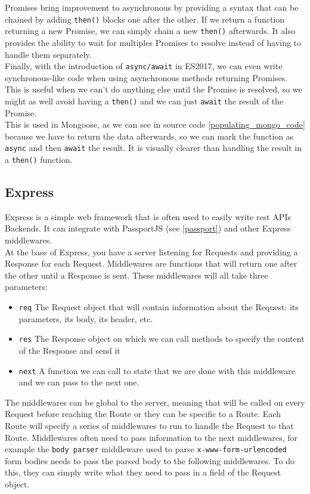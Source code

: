 \documentclass[twoside, openright,11pt,a4paper]{book}
\begin{document}
Promises bring improvement to asynchronous by providing a syntax that can be chained by adding \verb+then()+ blocks one after the other. If we return a function returning a new Promise, we can simply chain a new \verb+then()+ afterwards. It also provides the ability to wait for multiples Promises to resolve instead of having to handle them separately. \\

Finally, with the introduction of \verb+async/await+\cite{google:dev:async_await} in ES2017, we can even write synchronous-like code when using asynchronous methods returning Promises. This is useful when we can't do anything else until the Promise is resolved, so we might as well avoid having a \verb+then()+ and we can just \verb+await+ the result of the Promise. \\

This is used in Mongoose, as we can see in source code \ref{populating_mongo_code} because we have to return the data afterwards, so we can mark the function as \verb+async+ and then \verb+await+ the result. It is visually clearer than handling the result in a \verb+then()+ function.
\subsection{Express}
Express is a simple web framework that is often used to easily write \gls{rest} APIs Backends. It can integrate with PassportJS (see \ref{passport}) and other Express middlewares. \\

At the base of Express, you have a server listening for Requests and providing a Response for each Request. Middlewares\cite{express:doc:middlewares} are functions that will return one after the other until a Response is sent. These middlewares will all take three parameters:
\begin{itemize}
	\item \verb+req+ The Request object that will contain information about the Request: its parameters, its body, its header, etc.
	\item \verb+res+ The Response object on which we can call methods to specify the content of the Response and send it
	\item \verb+next+ A function we can call to state that we are done with this middleware and we can pass to the next one.
\end{itemize}
The middlewares can be global to the server, meaning that will be called on every Request before reaching the Route or they can be specific to a Route. Each Route will specify a series of middlewares to run to handle the Request to that Route. Middlewares often need to pass information to the next middlewares, for example the \verb+body parser+ middleware used to parse \verb+x-www-form-urlencoded+ form bodies needs to pass the parsed body to the following middlewares. To do this, they can simply write what they need to pass in a field of the Request object. \\
\end{document}
